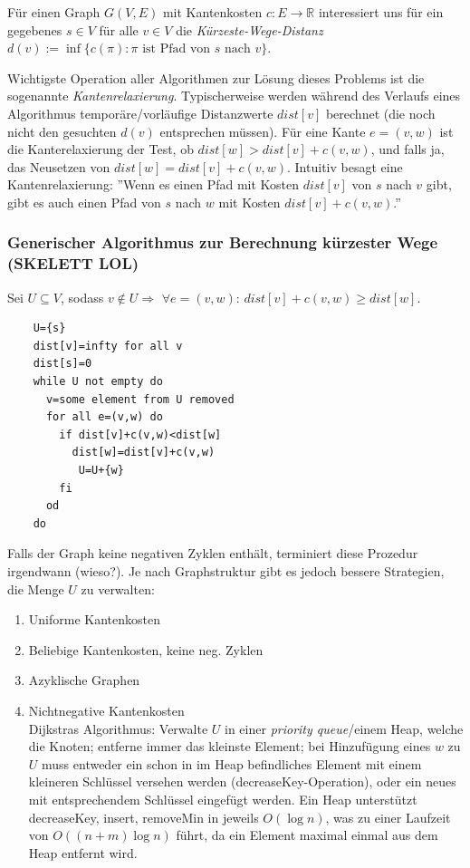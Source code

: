 \documentclass{article}
\begin{document}
Für einen Graph $G(V,E)$ mit Kantenkosten $c:E\rightarrow \mathbb{R}$ interessiert uns für ein 
gegebenes $s\in V$ für alle $v\in V$ die \emph{Kürzeste-Wege-Distanz} $d(v):=\inf \{c(\pi): \pi \mbox{ ist Pfad von }s \mbox{ nach } v\}$.

Wichtigste Operation aller Algorithmen zur Lösung dieses Problems ist die sogenannte \emph{Kantenrelaxierung}. Typischerweise
werden während des Verlaufs eines Algorithmus temporäre/vorläufige Distanzwerte $dist[v]$ berechnet (die noch nicht den gesuchten $d(v)$ entsprechen
müssen). Für eine Kante $e=(v,w)$ ist die Kanterelaxierung der Test, ob $dist[w]>dist[v]+c(v,w)$, und falls ja, das Neusetzen von $dist[w]=dist[v]+c(v,w)$.
Intuitiv besagt eine Kantenrelaxierung: ''Wenn es einen Pfad mit Kosten $dist[v]$ von $s$ nach $v$ gibt, gibt es auch einen Pfad von $s$ nach $w$ mit
Kosten $dist[v]+c(v,w)$.''

\subsubsection{Generischer Algorithmus zur Berechnung kürzester Wege (SKELETT LOL)}

Sei $U\subseteq V$, sodass $v\notin U \Rightarrow$ $\forall e=(v,w)$: $dist[v]+c(v,w)\geq dist[w]$.

\begin{verbatim}
	U={s}
	dist[v]=infty for all v
	dist[s]=0	
	while U not empty do
	  v=some element from U removed
	  for all e=(v,w) do
	    if dist[v]+c(v,w)<dist[w]
	      dist[w]=dist[v]+c(v,w)
	       U=U+{w}
	    fi
	  od
	do 

\end{verbatim}

Falls der Graph keine negativen Zyklen enthält, terminiert diese Prozedur irgendwann (wieso?).
Je nach Graphstruktur gibt es jedoch bessere Strategien, die Menge $U$ zu verwalten:
\begin{enumerate}
  \item Uniforme Kantenkosten
  \item Beliebige Kantenkosten, keine neg. Zyklen
  \item Azyklische Graphen
  \item Nichtnegative Kantenkosten\\
  Dijkstras Algorithmus: Verwalte $U$ in einer \emph{priority queue}/einem Heap, welche die Knoten; entferne 
  immer das kleinste Element; bei Hinzufügung eines $w$ zu $U$ muss entweder ein schon in im Heap befindliches 
  Element mit einem kleineren Schlüssel versehen werden (decreaseKey-Operation), oder ein neues mit entsprechendem 
  Schlüssel eingefügt werden. Ein Heap unterstützt decreaseKey, insert, removeMin in jeweils $O(\log n)$, was zu einer 
  Laufzeit von $O((n+m)\log n)$ führt, da ein Element maximal einmal aus dem  Heap entfernt wird.
 
\end{enumerate}
\end{document}
